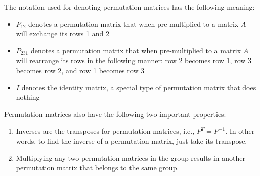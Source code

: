 \documentclass[../main.tex]{subfiles}
\begin{document}
The notation used for denoting permutation matrices has the following meaning:
\begin{itemize}
    \item \(P_{12}\) denotes a permutation matrix that when pre-multiplied to a matrix \(A\) will exchange its rows 1 and 2
    \item \(P_{231}\) denotes a permutation matrix that when pre-multiplied to a matrix \(A\) will rearrange its rows in the following manner: row 2 becomes row 1, row 3 becomes row 2, and row 1 becomes row 3
    \item \(I\) denotes the identity matrix, a special type of permutation matrix that does nothing
\end{itemize}
Permutation matrices also have the following two important properties:
\begin{enumerate}
    \item Inverses are the transposes for permutation matrices, i.e., \(P^{T} = P^{-1}\). In other words, to find the inverse of a permutation matrix, just take its transpose.
    \item Multiplying any two permutation matrices in the group results in another permutation matrix that belongs to the same group.
\end{enumerate}


\end{document}
